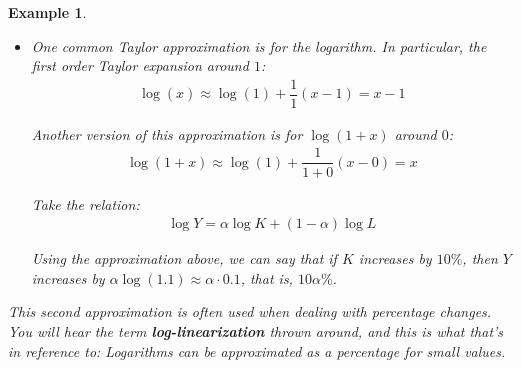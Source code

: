 \documentclass{article}
\newcommand{\keyword}[1]{\textit{\textbf{#1}}\index{#1}}
\theoremstyle{mythm}
\theoremstyle{mydef}
\newtheorem{ex}{Example}
\begin{document}
\begin{ex}
\begin{itemize}
      The left and right figures correspond to:
      \begin{align*}
        f(x)
        & = \dfrac{f(1)}{0!} (x - 1)^0 + \dfrac{f^\prime(c)}{1!} (x - 1)^1
        \\
        & = 4 + (2c + 3) (x - 1)
        \\
        f(x)
        & \approx \dfrac{f(1)}{0!} (x - 1)^0 + \dfrac{f^\prime(1)}{1!} (x - 1)^1
        \\
        & = 4 + 5 (x - 1)
      \end{align*}

      We can see on the left that there is indeed some number $c$ s.t. Taylor's theorem holds. For our sample value of $x = 0.5$ we find $c = 0.75 \in (0.5, 1)$. On the right figure, on the other hand, we plot the \textit{approximation}. In this case, the function and the approximation are exactly equal at $1$, since the approximation at that point simplifies to $f(1)$. We can also see that around $x = 1$ the approximation is fairly good! However, farther away the error increases, as we would expect.

    \item One common Taylor approximation is for the logarithm. In particular, the first order Taylor expansion around  $1$:
      \begin{align*}
        \log(x) \approx \log(1) + \dfrac{1}{1} (x - 1) = x - 1
      \end{align*}

      Another version of this approximation is for $\log(1 + x)$ around $0$:
      \begin{align*}
        \log(1 + x) \approx \log(1) + \dfrac{1}{1 + 0} (x - 0) = x
      \end{align*}

      Take the relation:
      \begin{align*}
        \log Y = \alpha \log K + (1 - \alpha) \log L
      \end{align*}

      Using the approximation above, we can say that if $K$ increases by $10\%$, then $Y$ increases by $\alpha \log (1.1) \approx \alpha \cdot 0.1$, that is, $10\alpha \%$.
  \end{itemize}

  This second approximation is often used when dealing with percentage changes. You will hear the term \keyword{log-linearization}  thrown around, and this is what that's in reference to: Logarithms can be approximated as a percentage for small values.
\end{ex}
\end{document}
